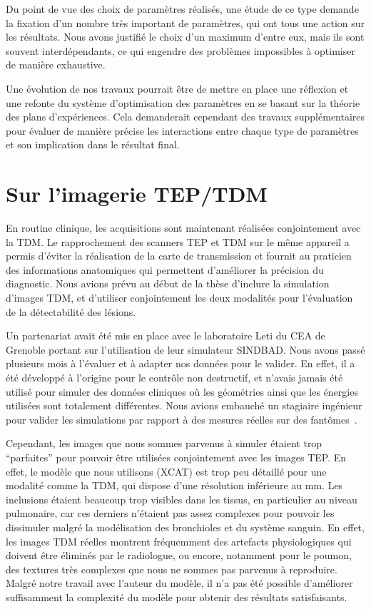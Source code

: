 Du point de vue des choix de paramètres réalisés, une étude de
ce type demande la fixation d'un nombre très important de
paramètres, qui ont tous une action sur les résultats. Nous avons justifié le
choix d'un maximum d'entre eux, mais ils sont souvent interdépendants, ce qui
engendre des problèmes impossibles à optimiser de manière exhaustive.  

Une évolution de nos travaux pourrait être de mettre en place une réflexion et
une refonte du système d'optimisation des paramètres en se basant sur la théorie
des plans d'expériences. Cela demanderait cependant des travaux supplémentaires
pour évaluer de manière précise les interactions entre chaque type de paramètres
et son implication dans le résultat final. 


\section{Sur l'imagerie TEP/TDM}

En routine clinique, les acquisitions sont maintenant réalisées conjointement
avec la TDM. Le rapprochement des scanners TEP et TDM sur le même appareil a
permis d'éviter la réalisation de la carte de transmission et fournit au
praticien des informations anatomiques qui permettent d'améliorer la précision
du diagnostic. Nous avions prévu au début de la thèse d'inclure la simulation
d'images TDM, et d'utiliser conjointement les deux modalités pour l'évaluation
de la détectabilité des lésions.  

Un partenariat avait été mis en place avec le laboratoire Leti du CEA de
Grenoble portant sur l'utilisation de leur simulateur SINDBAD. Nous avons passé
plusieurs mois à l'évaluer et à adapter nos données pour le valider. En effet,
il a été développé à l'origine pour le contrôle non destructif, et n'avais
jamais été utilisé pour simuler des données cliniques où les géométries ainsi
que les énergies utilisées sont totalement différentes. Nous avions embauché un
stagiaire ingénieur pour valider les simulations par rapport à des mesures
réelles sur des fantômes~\cite{leduvehat}.  

Cependant, les images que nous sommes parvenus à simuler étaient trop
``parfaites'' pour pouvoir être utilisées conjointement avec les images TEP. En
effet, le modèle que nous utilisons (XCAT) est trop peu détaillé pour une
modalité comme la TDM, qui dispose d'une résolution inférieure au mm. Les
inclusions étaient beaucoup trop visibles dans les tissus, en particulier
au niveau pulmonaire, car ces derniers n'étaient pas assez complexes pour
pouvoir les dissimuler malgré la modélisation des bronchioles et du système
sanguin. En effet, les images TDM réelles montrent fréquemment des artefacts
physiologiques qui doivent être éliminés par le radiologue, ou encore,
notamment pour le poumon, des textures très complexes que nous ne sommes pas
parvenus à reproduire. Malgré notre travail avec l'auteur du modèle, il n'a pas
été possible d'améliorer suffisamment la complexité du modèle pour obtenir des
résultats satisfaisants. 

